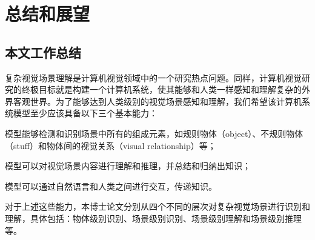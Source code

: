 \chapter{总结和展望}

\section{本文工作总结}

复杂视觉场景理解是计算机视觉领域中的一个研究热点问题。同样，计算机视觉研究的终极目标就是构建一个计算机系统，使其能够和人类一样感知和理解复杂的外界客观世界。为了能够达到人类级别的视觉场景感知和理解，我们希望该计算机系统模型至少应该具备以下三个基本能力：
\begin{asparaenum}
\item 模型能够检测和识别场景中所有的组成元素，如规则物体（object）、不规则物体（stuff）和物体间的视觉关系（visual relationship）等；

\item 模型可以对视觉场景内容进行理解和推理，并总结和归纳出知识；

\item 模型可以通过自然语言和人类之间进行交互，传递知识。
\end{asparaenum}

对于上述这些能力，本博士论文分别从四个不同的层次对复杂视觉场景进行识别和理解，具体包括：物体级别识别、场景级别识别、场景级别理解和场景级别推理等。

